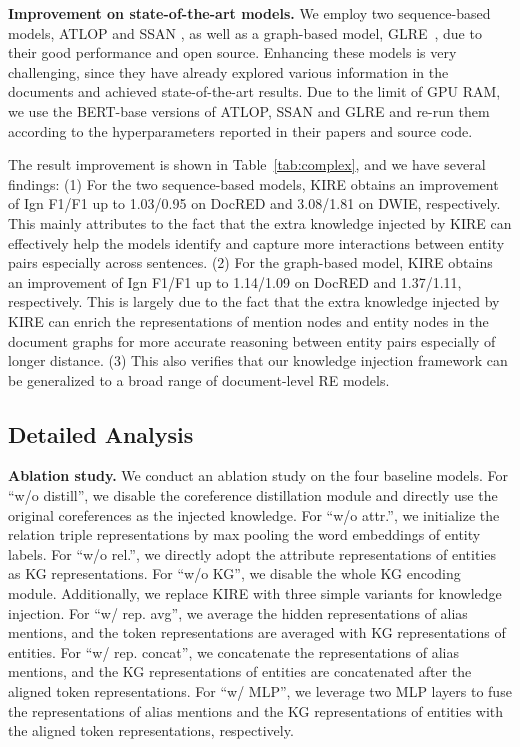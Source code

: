 \documentclass[runningheads]{llncs}
\begin{document}
\textbf{Improvement on state-of-the-art models.}
We employ two sequence-based models, ATLOP \cite{zhou2021document} and SSAN \cite{xu2021entity}, as well as a graph-based model, GLRE~\cite{wang2020global}, due to their good performance and open source.
Enhancing these models is very challenging, since they have already explored various information in the documents and achieved state-of-the-art results. 
Due to the limit of GPU RAM, we use the BERT-base versions of ATLOP, SSAN and GLRE and re-run them according to the hyperparameters reported in their papers and source code.


The result improvement is shown in Table~\ref{tab:complex}, and we have several findings: 
(1) For the two sequence-based models, KIRE obtains an improvement of Ign F1/F1 up to 1.03/0.95 on DocRED and 3.08/1.81 on DWIE, respectively. 
This mainly attributes to the fact that the extra knowledge injected by KIRE can effectively help the models identify and capture more interactions between entity pairs especially across sentences.
(2) For the graph-based model, KIRE obtains an improvement of Ign F1/F1 up to 1.14/1.09 on DocRED and 1.37/1.11, respectively. 
This is largely due to the fact that the extra knowledge injected by KIRE can enrich the representations of mention nodes and entity nodes in the document graphs for more accurate reasoning between entity pairs especially of longer distance.
(3) This also verifies that our knowledge injection framework can be generalized to a broad range of document-level RE models.







\subsection{Detailed Analysis}
\label{subsect:analysis}

\textbf{Ablation study.} We conduct an ablation study on the four baseline models. 
For ``w/o distill'', we disable the coreference distillation module and directly use the original coreferences as the injected knowledge. 
For ``w/o attr.'', we initialize the relation triple representations by max pooling the word embeddings of entity labels.
For ``w/o rel.'', we directly adopt the attribute representations of entities as KG representations. 
For ``w/o KG'', we disable the whole KG encoding module.
Additionally, we replace KIRE with three simple variants for knowledge injection.
For ``w/ rep. avg'', we average the hidden representations of alias mentions, and the token representations are averaged with KG representations of entities.
For ``w/ rep. concat'', we concatenate the representations of alias mentions, and the KG representations of entities are concatenated after the aligned token representations.
For ``w/ MLP'', we leverage two MLP layers to fuse the representations of alias mentions and the KG representations of entities with the aligned token representations, respectively.
\end{document}
